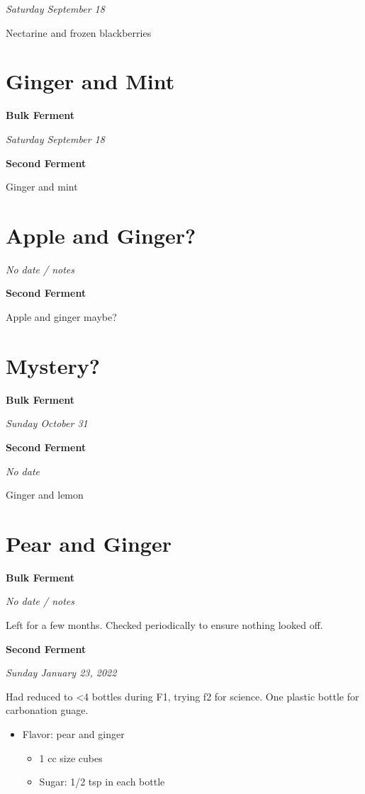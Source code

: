 \documentclass[
]{book}
\providecommand{\tightlist}{%
  \setlength{\itemsep}{0pt}\setlength{\parskip}{0pt}}
\begin{document}
\emph{Saturday September 18}

Nectarine and frozen blackberries

\hypertarget{ginger-and-mint}{%
\section{Ginger and Mint}\label{ginger-and-mint}}

\textbf{Bulk Ferment}

\emph{Saturday September 18}

\textbf{Second Ferment}

Ginger and mint

\hypertarget{apple-and-ginger}{%
\section{Apple and Ginger?}\label{apple-and-ginger}}

\emph{No date / notes}

\textbf{Second Ferment}

Apple and ginger maybe?

\hypertarget{mystery}{%
\section{Mystery?}\label{mystery}}

\textbf{Bulk Ferment}

\emph{Sunday October 31}

\textbf{Second Ferment}

\emph{No date}

Ginger and lemon

\hypertarget{pear-and-ginger}{%
\section{Pear and Ginger}\label{pear-and-ginger}}

\textbf{Bulk Ferment}

\emph{No date / notes}

Left for a few months. Checked periodically to ensure nothing looked off.

\textbf{Second Ferment}

\emph{Sunday January 23, 2022}

Had reduced to \textless4 bottles during F1, trying f2 for science. One plastic bottle for carbonation guage.

\begin{itemize}
\tightlist
\item
  Flavor: pear and ginger

  \begin{itemize}
  \tightlist
  \item
    1 cc size cubes
  \item
    Sugar: 1/2 tsp in each bottle
  \end{itemize}
\end{itemize}
\end{document}
